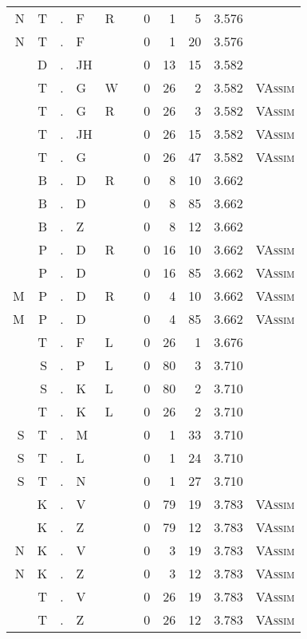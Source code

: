 \begin{longtable}{r@{ } r@{ } c@{ } l@{ } l@{ } l@{ } r r r r l }
N & T & . & F & R &   & 0 & 1 & 5 & 3.576 &  \\
N & T & . & F &   &   & 0 & 1 & 20 & 3.576 &  \\
  & D & . & JH &   &   & 0 & 13 & 15 & 3.582 &  \\
  & T & . & G & W &   & 0 & 26 & 2 & 3.582 & \textsc{VAssim} \\
  & T & . & G & R &   & 0 & 26 & 3 & 3.582 & \textsc{VAssim} \\
  & T & . & JH &   &   & 0 & 26 & 15 & 3.582 & \textsc{VAssim} \\
  & T & . & G &   &   & 0 & 26 & 47 & 3.582 & \textsc{VAssim} \\
  & B & . & D & R &   & 0 & 8 & 10 & 3.662 &  \\
  & B & . & D &   &   & 0 & 8 & 85 & 3.662 &  \\
  & B & . & Z &   &   & 0 & 8 & 12 & 3.662 &  \\
  & P & . & D & R &   & 0 & 16 & 10 & 3.662 & \textsc{VAssim} \\
  & P & . & D &   &   & 0 & 16 & 85 & 3.662 & \textsc{VAssim} \\
M & P & . & D & R &   & 0 & 4 & 10 & 3.662 & \textsc{VAssim} \\
M & P & . & D &   &   & 0 & 4 & 85 & 3.662 & \textsc{VAssim} \\
  & T & . & F & L &   & 0 & 26 & 1 & 3.676 &  \\
  & S & . & P & L &   & 0 & 80 & 3 & 3.710 &  \\
  & S & . & K & L &   & 0 & 80 & 2 & 3.710 &  \\
  & T & . & K & L &   & 0 & 26 & 2 & 3.710 &  \\
S & T & . & M &   &   & 0 & 1 & 33 & 3.710 &  \\
S & T & . & L &   &   & 0 & 1 & 24 & 3.710 &  \\
S & T & . & N &   &   & 0 & 1 & 27 & 3.710 &  \\
  & K & . & V &   &   & 0 & 79 & 19 & 3.783 & \textsc{VAssim} \\
  & K & . & Z &   &   & 0 & 79 & 12 & 3.783 & \textsc{VAssim} \\
N & K & . & V &   &   & 0 & 3 & 19 & 3.783 & \textsc{VAssim} \\
N & K & . & Z &   &   & 0 & 3 & 12 & 3.783 & \textsc{VAssim} \\
  & T & . & V &   &   & 0 & 26 & 19 & 3.783 & \textsc{VAssim} \\
  & T & . & Z &   &   & 0 & 26 & 12 & 3.783 & \textsc{VAssim} \\

\end{longtable}
